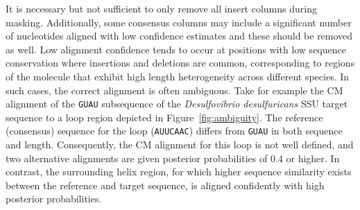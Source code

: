 It is necessary but not sufficient to only remove all insert columns
during masking. Additionally, some consensus columns may include
a significant number of nucleotides aligned with low confidence
estimates and these should be removed as well. 
Low alignment confidence tends to occur at positions with low sequence
conservation where insertions and deletions are common, 
corresponding to regions of the molecule that exhibit high length
heterogeneity across different species. 
In such cases, the correct alignment is often ambiguous.
Take for example the CM alignment
of the {\tt GUAU} subsequence of the \emph{Desulfovibrio
desulfuricans} SSU target sequence to a loop region depicted in
Figure~\ref{fig:ambiguity}. The reference (consensus) sequence for the
loop ({\tt AUUCAAC}) differs from {\tt GUAU} in both sequence and
length. Consequently, the CM alignment for this loop is not well
defined, and two alternative alignments are given posterior
probabilities of $0.4$ or higher.  In contrast, the surrounding helix
region, for which higher sequence similarity exists between the
reference and target sequence, is aligned confidently with high
posterior probabilities.


